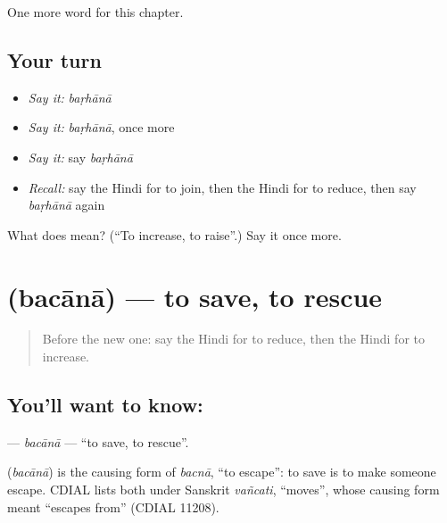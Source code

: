 \begin{grammarlens}[title={What you've built}]
One more word for this chapter.
\end{grammarlens}

\subsection*{Your turn}
\begin{itemize}
\raggedright
  \item \emph{Say it:} \emph{baṛhānā}
  \item \emph{Say it:} \emph{baṛhānā}, once more
  \item \emph{Say it:} say \emph{baṛhānā}
  \item \emph{Recall:} say the Hindi for to join, then the Hindi for to reduce, then say \emph{baṛhānā} again
\end{itemize}

\begin{tcolorbox}[breakable,colback=teal!4,colframe=teal!35!black,title={Before you move on}]
What does  mean? (\textquotedblleft{}To increase, to raise\textquotedblright{}.) Say it once more.
\end{tcolorbox}
\section[\texorpdfstring{\hi{बचाना} (bacānā)}{बचाना (bacānā)}]{ (bacānā) — to save, to rescue}

\label{lesson:HI-C169-bacana}



\begin{quote}
Before the new one: say the Hindi for to reduce, then the Hindi for to increase.
\end{quote}

\subsection*{You'll want to know: }
\textbf{} — \emph{bacānā} — \textquotedblleft{}to save, to rescue\textquotedblright{}.

\begin{cousinweb}
\textbf{} (\emph{bacānā}) is the causing form of \emph{bacnā}, \textquotedblleft{}to escape\textquotedblright{}: to save is to make someone escape. CDIAL lists both under Sanskrit \emph{vañcati}, \textquotedblleft{}moves\textquotedblright{}, whose causing form meant \textquotedblleft{}escapes from\textquotedblright{} (CDIAL 11208).
\end{cousinweb}

